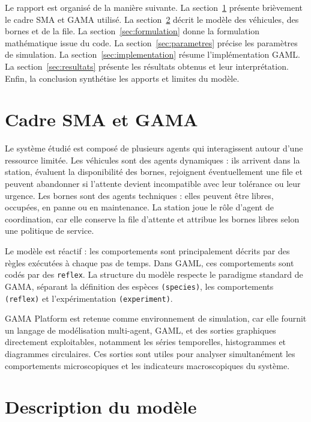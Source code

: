 \documentclass[11pt]{article}
\begin{document}
Le rapport est organisé de la manière suivante. La section~\ref{sec:cadre} présente brièvement le cadre SMA et GAMA utilisé. La section~\ref{sec:modele} décrit le modèle des véhicules, des bornes et de la file. La section~\ref{sec:formulation} donne la formulation mathématique issue du code. La section~\ref{sec:parametres} précise les paramètres de simulation. La section~\ref{sec:implementation} résume l'implémentation GAML. La section~\ref{sec:resultats} présente les résultats obtenus et leur interprétation. Enfin, la conclusion synthétise les apports et limites du modèle.
\newpage
\section{Cadre SMA et GAMA}\label{sec:cadre}

Le système étudié est composé de plusieurs agents qui interagissent autour d'une ressource limitée. Les véhicules sont des agents dynamiques : ils arrivent dans la station, évaluent la disponibilité des bornes, rejoignent éventuellement une file et peuvent abandonner si l'attente devient incompatible avec leur tolérance ou leur urgence. Les bornes sont des agents techniques : elles peuvent être libres, occupées, en panne ou en maintenance. La station joue le rôle d'agent de coordination, car elle conserve la file d'attente et attribue les bornes libres selon une politique de service.

Le modèle est réactif : les comportements sont principalement décrits par des règles exécutées à chaque pas de temps. Dans GAML, ces comportements sont codés par des \texttt{reflex}. La structure du modèle respecte le paradigme standard de GAMA, séparant la définition des espèces \texttt{(species)}, les comportements \texttt{(reflex)} et l'expérimentation \texttt{(experiment)}.



GAMA Platform est retenue comme environnement de simulation, car elle fournit un langage de modélisation multi-agent, GAML, et des sorties graphiques directement exploitables, notamment les séries temporelles, histogrammes et diagrammes circulaires. Ces sorties sont utiles pour analyser simultanément les comportements microscopiques et les indicateurs macroscopiques du système.

\section{Description du modèle}\label{sec:modele}
\end{document}
